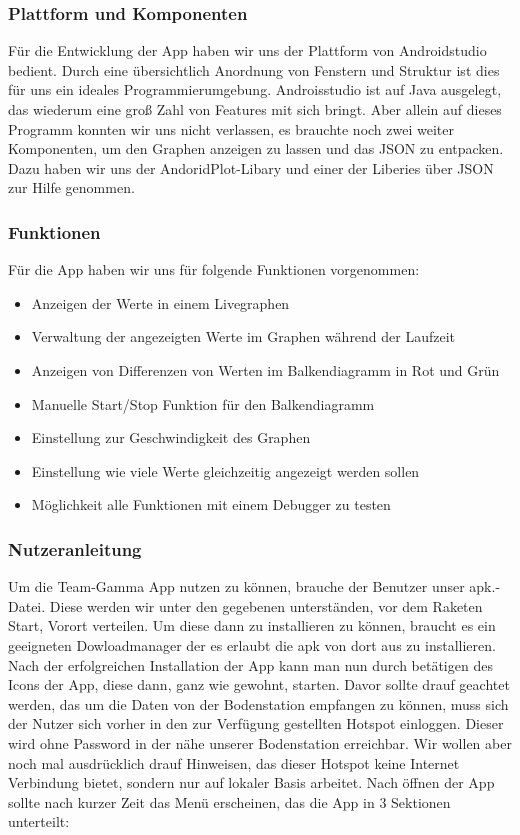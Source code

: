 \subsubsection{Plattform und Komponenten}
Für die Entwicklung der App haben wir uns der Plattform von Androidstudio bedient. Durch eine übersichtlich Anordnung von Fenstern und Struktur ist dies für uns ein ideales Programmierumgebung. Androisstudio ist auf Java ausgelegt, das wiederum eine groß Zahl von Features mit sich bringt. Aber allein auf dieses Programm konnten wir uns nicht verlassen, es brauchte noch zwei weiter Komponenten, um den Graphen anzeigen zu lassen und das JSON zu entpacken. Dazu haben wir uns der AndoridPlot-Libary und einer der Liberies über JSON zur Hilfe genommen.

\subsubsection{Funktionen}
Für die App haben wir uns für folgende Funktionen vorgenommen:
\begin{itemize}
	\item Anzeigen der Werte in einem Livegraphen
	\item Verwaltung der angezeigten Werte im Graphen während der Laufzeit
	\item Anzeigen von Differenzen von Werten im Balkendiagramm in Rot und Grün
	\item Manuelle Start/Stop Funktion für den Balkendiagramm
	\item Einstellung zur Geschwindigkeit des Graphen
	\item Einstellung wie viele Werte gleichzeitig angezeigt werden sollen
	\item Möglichkeit alle Funktionen mit einem Debugger zu testen
\end{itemize}

\subsubsection{Nutzeranleitung}
Um die Team-Gamma App nutzen zu können, brauche der Benutzer unser apk.-Datei. Diese werden wir unter den gegebenen unterständen, vor dem Raketen Start, Vorort verteilen. Um diese dann zu installieren zu können, braucht es ein geeigneten Dowloadmanager der es erlaubt die apk von dort aus zu installieren. Nach der erfolgreichen Installation der App kann man nun durch betätigen des Icons der App, diese dann, ganz wie gewohnt, starten. Davor sollte drauf geachtet werden, das um die Daten von der Bodenstation empfangen zu können, muss sich der Nutzer sich vorher in den zur Verfügung gestellten Hotspot einloggen. Dieser wird ohne Password in der nähe unserer Bodenstation erreichbar. Wir wollen aber noch mal ausdrücklich drauf Hinweisen, das dieser Hotspot keine Internet Verbindung bietet, sondern nur auf lokaler Basis arbeitet.
Nach öffnen der App sollte nach kurzer Zeit das Menü erscheinen, das die App in 3 Sektionen unterteilt: 

